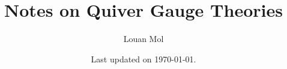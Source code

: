 \documentclass[a4paper,10pt]{article}
\title{\textbf{Notes on Quiver Gauge Theories}}
\author{Louan Mol}
\date{Last updated on \today.}
\begin{document}
%

\maketitle

\tableofcontents

\pagebreak

\nocite{*}




%

%

%

%

%

\pagebreak

\listoftodos

\pagebreak

\printbibliography
\end{document}
